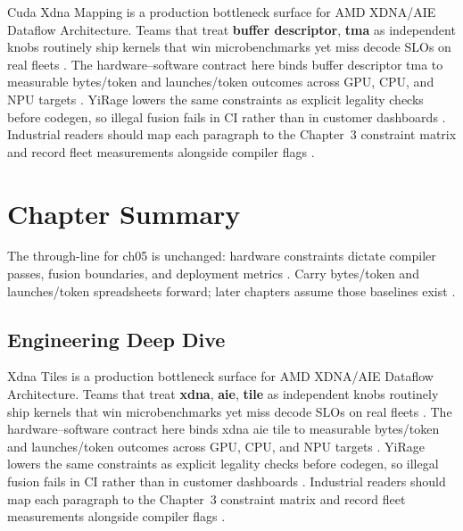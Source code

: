 Cuda Xdna Mapping is a production bottleneck surface for AMD XDNA/AIE Dataflow Architecture. Teams that treat \textbf{buffer descriptor}, \textbf{tma} as independent knobs routinely ship kernels that win microbenchmarks yet miss decode SLOs on real fleets \citep{amd2024aie,kwon2023vllm}. The hardware--software contract here binds buffer descriptor tma to measurable bytes/token and launches/token outcomes across GPU, CPU, and NPU targets \citep{dlbook,nvidia2024cudagraphs}. YiRage lowers the same constraints as explicit legality checks before codegen, so illegal fusion fails in CI rather than in customer dashboards \citep{dao2022flashattention,liu2024deepseekv3}. Industrial readers should map each paragraph to the Chapter~3 constraint matrix and record fleet measurements alongside compiler flags \citep{kwon2023vllm,patel2025llminference}.

\section{Chapter Summary}
\label{sec:ch05_summary}

The through-line for ch05 is unchanged: hardware constraints dictate compiler passes, fusion boundaries, and deployment metrics \citep{memoryfloor2026,amd2024xdna}. Carry bytes/token and launches/token spreadsheets forward; later chapters assume those baselines exist \citep{semianalysis2024tma,dlbook}.


\subsection{Engineering Deep Dive}
\label{sec:ch05_deep_dive}

Xdna Tiles is a production bottleneck surface for AMD XDNA/AIE Dataflow Architecture. Teams that treat \textbf{xdna}, \textbf{aie}, \textbf{tile} as independent knobs routinely ship kernels that win microbenchmarks yet miss decode SLOs on real fleets \citep{semianalysis2024tma,dlbook}. The hardware--software contract here binds xdna aie tile to measurable bytes/token and launches/token outcomes across GPU, CPU, and NPU targets \citep{amd2024xdna,dao2022flashattention}. YiRage lowers the same constraints as explicit legality checks before codegen, so illegal fusion fails in CI rather than in customer dashboards \citep{amd2024aie,kwon2023vllm}. Industrial readers should map each paragraph to the Chapter~3 constraint matrix and record fleet measurements alongside compiler flags \citep{dlbook,nvidia2024cudagraphs}.

